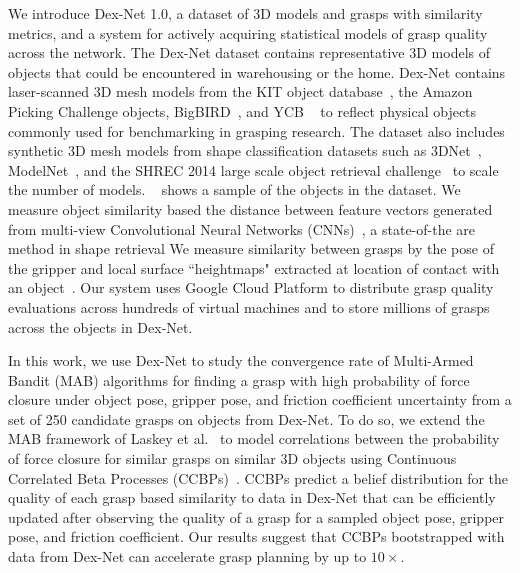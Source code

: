We introduce Dex-Net 1.0, a dataset of 3D models and grasps with similarity metrics, and a system for actively acquiring statistical models of grasp quality across the network.
The Dex-Net dataset contains representative 3D models of objects that could be encountered in warehousing or the home.
Dex-Net contains laser-scanned 3D mesh models from the KIT object database~\cite{kasper2012kit}, the Amazon Picking Challenge objects, BigBIRD~\cite{singh2014bigbird}, and YCB ~\cite{calli2015benchmarking} to reflect physical objects commonly used for benchmarking in grasping research.
The dataset also includes synthetic 3D mesh models from shape classification datasets such as 3DNet~\cite{wohlkinger20123dnet}, ModelNet~\cite{wu20143d}, and the SHREC 2014 large scale object retrieval challenge~\cite{li2015comparison} to scale the number of models.
~ shows a sample of the objects in the dataset.
We measure object similarity based the distance between feature vectors generated from multi-view Convolutional Neural Networks (CNNs)~\cite{su2015multi}, a state-of-the are method in shape retrieval
We measure similarity between grasps by the pose of the gripper and local surface ``heightmaps" extracted at location of contact with an object~\cite{herzog2012template, kappler2015leveraging}.
Our system uses Google Cloud Platform to distribute grasp quality evaluations across hundreds of virtual machines and to store millions of grasps across the objects in Dex-Net.

In this work, we use Dex-Net to study the convergence rate of Multi-Armed Bandit (MAB) algorithms for finding a grasp with high probability of force closure under object pose, gripper pose, and friction coefficient uncertainty from a set of 250 candidate grasps on objects from Dex-Net.
To do so, we extend the MAB framework of Laskey et al.~\cite{laskey2015bandits} to model correlations between the probability of force closure for similar grasps on similar 3D objects using Continuous Correlated Beta Processes (CCBPs)~\cite{goetschalckx2011continuous, montesano2012active}.
CCBPs predict a belief distribution for the quality of each grasp based similarity to data in Dex-Net that can be efficiently updated after observing the quality of a grasp for a sampled object pose, gripper pose, and friction coefficient.
Our results suggest that CCBPs bootstrapped with data from Dex-Net can accelerate grasp planning by up to $10\times$.


 





